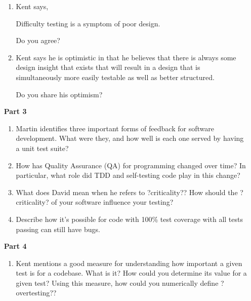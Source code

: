 \begin{enumerate}
\begin{enumerate}
			\item Kent says,

			Difficulty testing is a symptom of poor design.

			Do you agree?


			\item Kent says he is optimistic in that he believes that there is always some design insight that exists that will result in a design that is 			simultaneously more easily testable as well as better structured.

			Do you share his optimism?


		\end{enumerate}
	
	\item[\bf{Part 3}]
		
		\begin{enumerate}
			\item Martin identifies three important forms of feedback for software development. What were they, and how well is each one served by having a unit test suite?


			\item How has Quality Assurance (QA) for programming changed over time? In particular, what role did TDD and self-testing code play in this change?


			\item What does David mean when he refers to ?criticality?? How should the ?criticality? of your software influence your testing?


			\item Describe how it's possible for code with 100\% test coverage with all tests passing can still have bugs.


		\end{enumerate}
		
	\item[\bf{Part 4}]
		
		\begin{enumerate}
			\item Kent mentions a good measure for understanding how important a given test is for a codebase. What is it? How could you determine its value for a given test? Using this measure, how could you numerically define ?overtesting??


\end{enumerate}
\end{enumerate}
